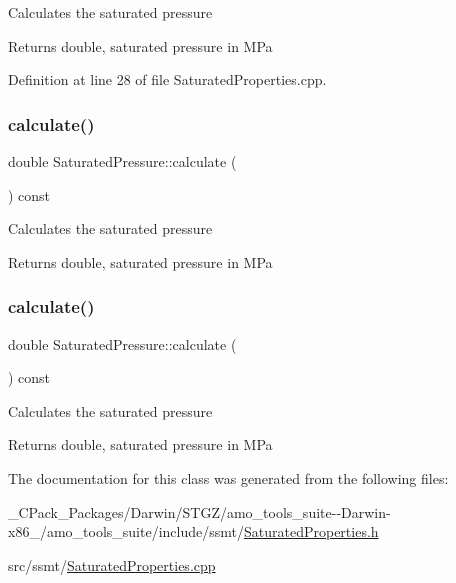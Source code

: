 Calculates the saturated pressure

\begin{DoxyReturn}{Returns}
double, saturated pressure in M\+Pa 
\end{DoxyReturn}


Definition at line 28 of file Saturated\+Properties.\+cpp.

\mbox{\label{class_saturated_pressure_a8ef5357b4f8af1aeaa8dde6ae05b9daa}} 
\subsubsection{\texorpdfstring{calculate()}{calculate()}\hspace{0.1cm}{\footnotesize\ttfamily [2/3]}}
{\footnotesize\ttfamily double Saturated\+Pressure\+::calculate (\begin{DoxyParamCaption}{ }\end{DoxyParamCaption}) const}

Calculates the saturated pressure

\begin{DoxyReturn}{Returns}
double, saturated pressure in M\+Pa 
\end{DoxyReturn}
\mbox{\label{class_saturated_pressure_a8ef5357b4f8af1aeaa8dde6ae05b9daa}} 
\subsubsection{\texorpdfstring{calculate()}{calculate()}\hspace{0.1cm}{\footnotesize\ttfamily [3/3]}}
{\footnotesize\ttfamily double Saturated\+Pressure\+::calculate (\begin{DoxyParamCaption}{ }\end{DoxyParamCaption}) const}

Calculates the saturated pressure

\begin{DoxyReturn}{Returns}
double, saturated pressure in M\+Pa 
\end{DoxyReturn}


The documentation for this class was generated from the following files\+:\begin{DoxyCompactItemize}
\item 
\+\_\+\+C\+Pack\+\_\+\+Packages/\+Darwin/\+S\+T\+G\+Z/amo\+\_\+tools\+\_\+suite-\/-\/\+Darwin-\/x86\+\_/amo\+\_\+tools\+\_\+suite/include/ssmt/\hyperlink{___c_pack___packages_2_darwin_2_s_t_g_z_2amo__tools__suite--_darwin-x86__64_2amo__tools__suite_2b97ccf799ea6561aa4d6a618c8073459}{Saturated\+Properties.\+h}\item 
src/ssmt/\hyperlink{_saturated_properties_8cpp}{Saturated\+Properties.\+cpp}\end{DoxyCompactItemize}
